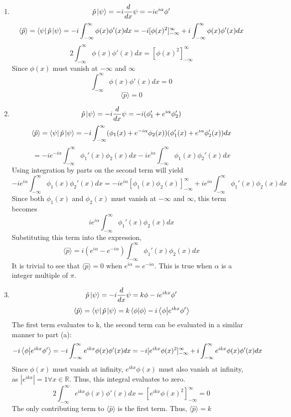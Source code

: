 \begin{sol}
\begin{enumerate}[label=\textbf{(\alph*)}]
	\item $$\hat{p}\ket{\psi}=-i\frac{d}{dx}\psi=-ie^{i\alpha}\phi'$$
    $$\langle\hat{p}\rangle=\bra{\psi}\hat{p}\ket{\psi}=-i\int_{-\infty}^{\infty}\phi(x)\phi'(x)dx=-i[\phi(x)^2]_{-\infty}^{\infty}+i\int_{-\infty}^{\infty}\phi(x)\phi'(x)dx$$
      $$2\int_{-\infty}^{\infty}\phi(x)\phi'(x)dx=[\phi(x)^2]_{-\infty}^{\infty}$$
    Since $\phi(x)$ must vanish at $-\infty$ and $\infty$
    $$\int_{-\infty}^{\infty}\phi(x)\phi'(x)dx=0$$
    $$\langle\hat{p}\rangle=0$$
    \item $$\hat{p}\ket{\psi}=-i\frac{d}{dx}\psi=-i(\phi_1'+e^{i\alpha}\phi_2')$$
    $$\langle\hat{p}\rangle=\bra{\psi}\hat{p}\ket{\psi}=-i\int_{-\infty}^{\infty}(\phi_1 (x)+e^{-i\alpha}\phi_2(x))(\phi_1'(x)+e^{i\alpha}\phi_2'(x))dx$$
    $$=-ie^{-i\alpha}\int_{-\infty}^{\infty}\phi_1'(x)\phi_2(x)dx-ie^{i\alpha}\int_{-\infty}^{\infty}\phi_1(x)\phi_2'(x)dx$$
Using integration by parts on the second term will yield
$$-ie^{i\alpha}\int_{-\infty}^{\infty}\phi_1(x)\phi_2'(x)dx=-ie^{i\alpha}[\phi_1(x)\phi_2(x)]_{-\infty}^{\infty}+ie^{i\alpha}\int_{-\infty}^{\infty}\phi_1'(x)\phi_2(x)dx$$
Since both $\phi_1(x)$ and $\phi_2(x)$ must vanish at $-\infty$ and $\infty$, this term becomes $$ie^{i\alpha}\int_{-\infty}^{\infty}\phi_1'(x)\phi_2(x)dx$$
Substituting this term into the expression,  $$\langle\hat{p}\rangle=i(e^{i\alpha}-e^{-i\alpha})\int_{-\infty}^{\infty}\phi_1'(x)\phi_2(x)dx$$
It is trivial to see that $\langle\hat{p}\rangle=0$ when $e^{i\alpha}=e^{-i\alpha}$. This is true when $\alpha$ is a integer multiple of $\pi$.
\item $$\hat{p}\ket{\psi}=-i\frac{d}{dx}\psi=k\phi-ie^{ikx}\phi'$$
 $$\langle\hat{p}\rangle=\bra{\psi}\hat{p}\ket{\psi}=k\braket{\phi}{\phi}-i\braket{\phi}{e^{ikx}\phi'}$$
The first term evaluates to k, the second term can be evaluated in a similar manner to part (a):$$-i\braket{\phi}{e^{ikx}\phi'}=-i\int_{-\infty}^{\infty}e^{ikx}\phi(x)\phi'(x)dx=-i[e^{ikx}\phi(x)^2]_{-\infty}^{\infty}+i\int_{-\infty}^{\infty}e^{ikx}\phi(x)\phi'(x)dx$$
Since $\phi(x)$ must vanish at infinity, $e^{ikx}\phi(x)$ must also vanish at infinity, as $|e^{ikx}|=1\forall x\in\mathbb{R}$. Thus, this integral evaluates to zero.
$$2\int_{-\infty}^{\infty}e^{ikx}\phi(x)\phi'(x)dx=[e^{ikx}\phi(x)^2]_{-\infty}^{\infty}=0$$
The only contributing term to $\langle\hat{p}\rangle$ is the first term. Thus, $\langle\hat{p}\rangle=k$
\end{enumerate}
\end{sol}